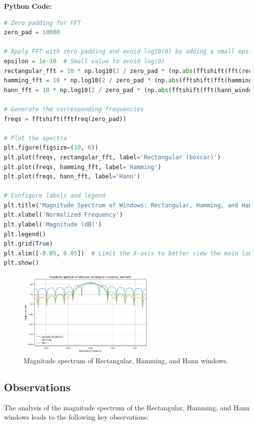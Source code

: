 \documentclass[10pt]{article}
\theoremstyle{definition}
\theoremstyle{remark}
\theoremstyle{definition}
\numberwithin{equation}{prob}
\begin{document}
\textbf{Python Code:}
\begin{lstlisting}[language=Python]
# Zero padding for FFT
zero_pad = 10000

# Apply FFT with zero padding and avoid log10(0) by adding a small epsilon value
epsilon = 1e-10  # Small value to avoid log(0)
rectangular_fft = 10 * np.log10(2 / zero_pad * (np.abs(fftshift(fft(rectangular_window, zero_pad))) + epsilon))
hamming_fft = 10 * np.log10(2 / zero_pad * (np.abs(fftshift(fft(hamming_window, zero_pad))) + epsilon))
hann_fft = 10 * np.log10(2 / zero_pad * (np.abs(fftshift(fft(hann_window, zero_pad))) + epsilon))

# Generate the corresponding frequencies
freqs = fftshift(fftfreq(zero_pad))

# Plot the spectra
plt.figure(figsize=(10, 6))
plt.plot(freqs, rectangular_fft, label='Rectangular (boxcar)')
plt.plot(freqs, hamming_fft, label='Hamming')
plt.plot(freqs, hann_fft, label='Hann')

# Configure labels and legend
plt.title('Magnitude Spectrum of Windows: Rectangular, Hamming, and Hann')
plt.xlabel('Normalized Frequency')
plt.ylabel('Magnitude (dB)')
plt.legend()
plt.grid(True)
plt.xlim([-0.05, 0.05])  # Limit the X-axis to better view the main lobe
plt.show()
\end{lstlisting}
\begin{figure}[H]
	\centering
	\includegraphics[width=0.6\textwidth]{./figures/Magnitude Spectrum of Windows.png}
	\caption{Magnitude spectrum of Rectangular, Hamming, and Hann windows.}
	\label{fig:freq_domain}
\end{figure}

\subsection*{Observations}
The analysis of the magnitude spectrum of the Rectangular, Hamming, and Hann windows leads to the following key observations:
\end{document}
